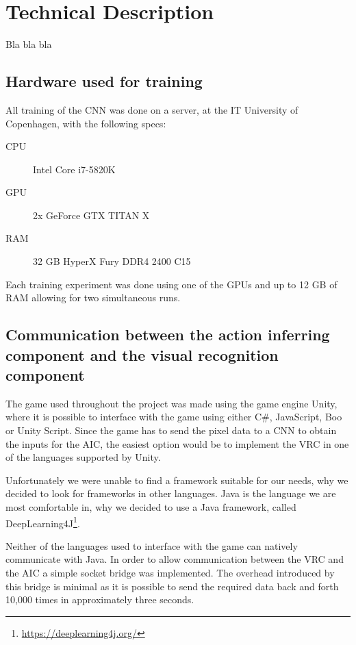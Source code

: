 
\section{Technical Description}
Bla bla bla

\subsection{Hardware used for training}
\label{sub:hardware}
All training of the CNN was done on a server, at the IT University of Copenhagen, with the following specs:

\begin{description}
	\item [CPU] Intel\textsuperscript{\textregistered} Core\textsuperscript{\texttrademark} i7-5820K
	\item [GPU] 2x GeForce\textsuperscript{\textregistered} GTX TITAN X
	\item [RAM] 32 GB HyperX Fury DDR4 2400 C15
\end{description}	

\noindent
Each training experiment was done using one of the GPUs and up to 12 GB of RAM allowing for two simultaneous runs.

\subsection{Communication between the action inferring component and the visual recognition component}
\label{sec:com-vrc-aic}
The game used throughout the project was made using the game engine Unity, where it is possible to interface with the game using either C\#, JavaScript, Boo or Unity Script. Since the game has to send the pixel data to a CNN to obtain the inputs for the AIC, the easiest option would be to implement the VRC in one of the languages supported by Unity.

Unfortunately we were unable to find a framework suitable for our needs, why we decided to look for frameworks in other languages. Java is the language we are most comfortable in, why we decided to use a Java framework, called DeepLearning4J\footnote{\url{https://deeplearning4j.org/}}.

Neither of the languages used to interface with the game can natively communicate with Java. In order to allow communication between the VRC and the AIC a simple socket bridge was implemented. The overhead introduced by this bridge is minimal as it is possible to send the required data back and forth 10,000 times in approximately three seconds.

